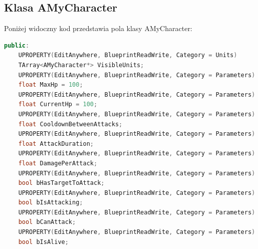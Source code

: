 \documentclass[12pt]{report}
\begin{document}
\subsection{Klasa AMyCharacter}
Poniżej widoczny kod przedstawia pola klasy AMyCharacter:

\begin{lstlisting}[language=C++, backgroundcolor=\color{black!5}, basicstyle=\footnotesize, caption=Publiczne pola klasy AMyCharacter]
public:	
	UPROPERTY(EditAnywhere, BlueprintReadWrite, Category = Units)
	TArray<AMyCharacter*> VisibleUnits;
	UPROPERTY(EditAnywhere, BlueprintReadWrite, Category = Parameters)
	float MaxHp = 100;
	UPROPERTY(EditAnywhere, BlueprintReadWrite, Category = Parameters)
	float CurrentHp = 100;
	UPROPERTY(EditAnywhere, BlueprintReadWrite, Category = Parameters)
	float CooldownBetweenAttacks;
	UPROPERTY(EditAnywhere, BlueprintReadWrite, Category = Parameters)
	float AttackDuration;
	UPROPERTY(EditAnywhere, BlueprintReadWrite, Category = Parameters)
	float DamagePerAttack;
	UPROPERTY(EditAnywhere, BlueprintReadWrite, Category = Parameters)
	bool bHasTargetToAttack;
	UPROPERTY(EditAnywhere, BlueprintReadWrite, Category = Parameters)
	bool bIsAttacking;
	UPROPERTY(EditAnywhere, BlueprintReadWrite, Category = Parameters)
	bool bCanAttack;
	UPROPERTY(EditAnywhere, BlueprintReadWrite, Category = Parameters)
	bool bIsAlive;
\end{lstlisting}
\end{document}
